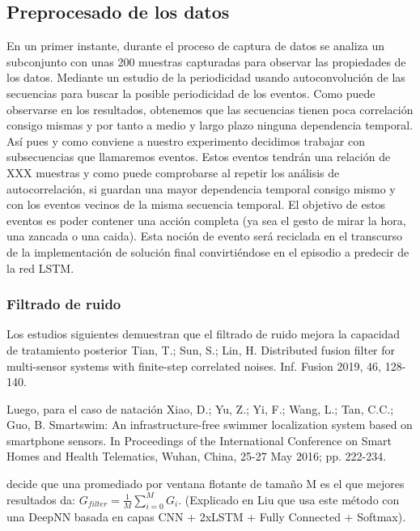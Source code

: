 \documentclass[../tfm.tex]{subfiles}
\begin{document}
\subsection{Preprocesado de los datos}

En un primer instante, durante el proceso de captura de datos se analiza un subconjunto con unas 200 muestras capturadas para observar las propiedades de los datos. Mediante un estudio de la periodicidad usando autoconvolución de las secuencias para buscar la posible periodicidad de los eventos. Como puede observarse en los resultados, obtenemos que las secuencias tienen poca correlación consigo mismas y por tanto a medio y largo plazo ninguna dependencia temporal. Así pues y como conviene a nuestro experimento decidimos trabajar con subsecuencias que llamaremos eventos. Estos eventos tendrán una relación de XXX muestras y como puede comprobarse al repetir los análisis de autocorrelación, si guardan una mayor dependencia temporal consigo mismo y con los eventos vecinos de la misma secuencia temporal. El objetivo de estos eventos es poder contener una acción completa (ya sea el gesto de mirar la hora, una zancada o una caida). Esta noción de evento será reciclada en el transcurso de la implementación de solución final convirtiéndose en el episodio a predecir de la red LSTM.

\subsubsection{Filtrado de ruido}
Los estudios siguientes demuestran que el filtrado de ruido mejora la capacidad de tratamiento posterior
Tian, T.; Sun, S.; Lin, H. Distributed fusion filter for multi-sensor systems with finite-step correlated noises. Inf. Fusion 2019, 46, 128-140.

Luego, para el caso de natación
Xiao, D.; Yu, Z.; Yi, F.; Wang, L.; Tan, C.C.; Guo, B. Smartswim: An infrastructure-free swimmer localization system based on smartphone sensors. In Proceedings of the International Conference on Smart Homes and Health Telematics, Wuhan, China, 25-27 May 2016; pp. 222-234.

decide que una promediado por ventana flotante de tamaño M es el que mejores resultados da: $G_{filter}=\frac{1}{M}\sum_{i=0}^{M}G_i$. (Explicado en Liu \cite{Liu2020} que usa este método con una DeepNN basada en capas CNN + 2xLSTM + Fully Connected + Softmax).






\iffalse
\begin{figure}[!ht]
  \centering
  
\caption{\label{fig:capturaFlow} Flujo de trabajo de la aplicación de captura de datos}
\end{figure}

\fi
\end{document}

